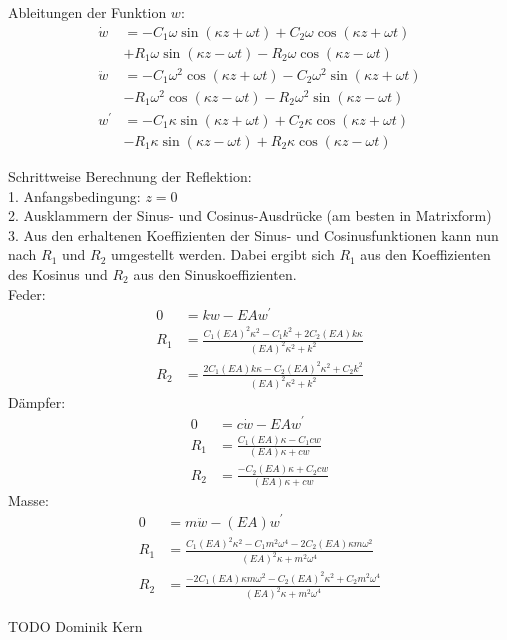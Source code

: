 \begin{solution}
        Ableitungen der Funktion $w$:
        \begin{align*}
            \dot{w} &= -C_1 \omega \sin(\kappa z + \omega t) + C_2 \omega \cos(\kappa z + \omega t) \\
                     &+ R_1 \omega \sin(\kappa z - \omega t) - R_2 \omega \cos(\kappa z - \omega t) \\
            \ddot{w} &= - C_1 \omega^2 \cos(\kappa z + \omega t) - C_2 \omega^2 \sin(\kappa z + \omega t) \\
                     &-R_1 \omega^2 \cos(\kappa z - \omega t) - R_2 \omega^2 \sin(\kappa z - \omega t) \\
            w^{'} &= -C_1 \kappa \sin(\kappa z + \omega t) + C_2 \kappa \cos(\kappa z + \omega t) \\
                   &-R_1 \kappa \sin(\kappa z - \omega t) + R_2 \kappa \cos(\kappa z - \omega t)
        \end{align*}

        Schrittweise Berechnung der Reflektion: \\
        1. Anfangsbedingung: $z=0$ \\
        2. Ausklammern der Sinus- und Cosinus-Ausdrücke (am besten in Matrixform)\\
        3. Aus den erhaltenen Koeffizienten der Sinus- und Cosinusfunktionen kann nun nach $R_1$ und $R_2$ umgestellt werden.
            Dabei ergibt sich $R_1$ aus den Koeffizienten des Kosinus und $R_2$ aus den Sinuskoeffizienten.\\

        Feder:
        \begin{align*}
            0 &= kw - EA  w^{'}\\
            R_1 &= \frac{C_1 {(EA)}^2 \kappa^2 - C_1 k^2 + 2C_2 (EA) k \kappa}{{(EA)}^2 \kappa^2 + k^2}\\
            R_2 &= \frac{2C_1 (EA) k \kappa - C_2 {(EA)}^2 \kappa^2 + C_2 k^2}{{(EA)}^2 \kappa^2 + k^2}
        \end{align*}
        Dämpfer:
        \begin{align*}
            0 &= c \dot{w} - EA  w^{'}\\
            R_1 &= \frac{C_1 (EA) \kappa - C_1 c w}{(EA) \kappa + cw}\\
            R_2 &= \frac{-C_2 (EA) \kappa + C_2 cw}{(EA) \kappa + cw}
        \end{align*}
        Masse:
        \begin{align*}
            0 &= m \ddot{w} - (EA) w^{'}\\
            R_1 &= \frac{C_1 {(EA)}^2 \kappa^2 - C_1 m^2 \omega^4 - 2C_2 (EA) \kappa m \omega^2}{{(EA)}^2 \kappa + m^2 \omega^4}\\
            R_2 &= \frac{-2C_1 (EA) \kappa m \omega^2 - C_2 {(EA)}^2 \kappa^2 + C_2 m^2 \omega^4}{{(EA)}^2 \kappa + m^2 \omega^4}
    \end{align*}
\end{solution}

TODO Dominik Kern

\vspace{1cm}


